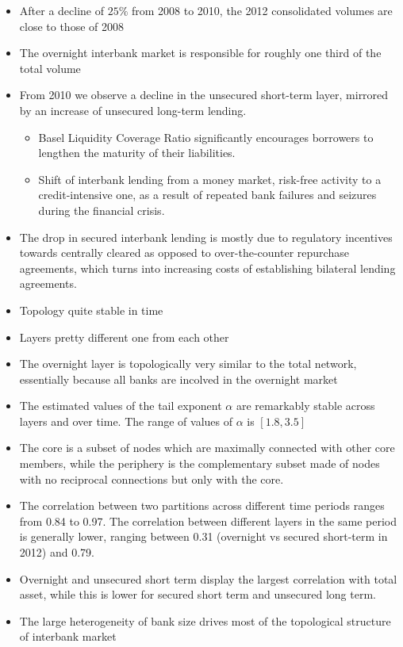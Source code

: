 \begin{itemize}
	\item After a decline of $25\%$ from 2008 to 2010, the 2012 consolidated volumes are close to those of 2008
	\item  The overnight interbank market is responsible for roughly one third of the total volume
	\item From 2010 we observe a decline in the unsecured short-term layer, mirrored by an increase of unsecured long-term lending. 
	\begin{itemize}
	\item Basel Liquidity Coverage Ratio significantly encourages borrowers to lengthen the maturity of their liabilities. 
	\item Shift of interbank lending from a money market, risk-free activity to a credit-intensive one, as a result of repeated bank failures and seizures during the financial crisis.
	\end{itemize}
	\item The drop in secured interbank lending is mostly due to regulatory incentives towards centrally cleared as opposed to over-the-counter repurchase agreements, which turns
	into increasing costs of establishing bilateral lending agreements.
	\item Topology quite stable in time
	\item Layers pretty different one from each other 
	\item The overnight layer is topologically very similar to the total network, essentially
	because all banks are incolved in the overnight market
	\item The estimated values of the tail exponent $\alpha$ are remarkably stable across layers and over time. The range of values of $\alpha$ is $[1.8, 3.5]$
	\item The core is a subset of nodes which are maximally connected with other core members, while the periphery is the complementary subset made of nodes with no reciprocal
	connections but only with the core.
	\item The correlation between two partitions across different time periods ranges from 0.84 to 0.97. The correlation between different layers in the same period is generally lower, ranging between 0.31 (overnight vs secured short-term in 2012) and 0.79.
	\item Overnight and unsecured short term display the largest correlation with total asset, while this is lower for secured short term and unsecured long term.
	\item The large heterogeneity of bank size drives most of the topological structure of interbank market
\end{itemize}
